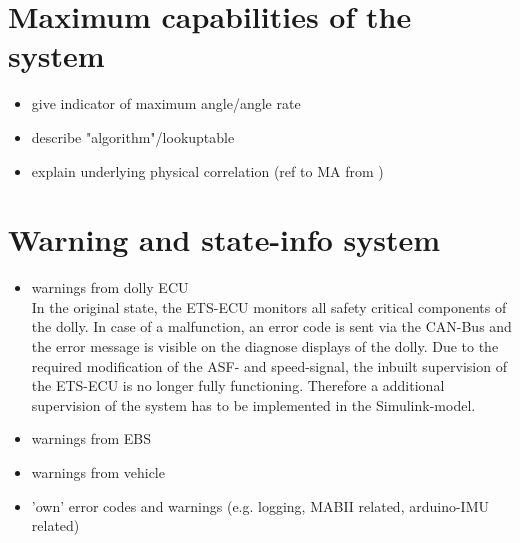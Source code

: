 \documentclass[ExampleMasters.tex]{subfiles}
\begin{document}
\section{Maximum capabilities of the system}
\label{sec:maxi_capabilities}
\begin{itemize}
	\item give indicator of maximum angle/angle rate
	\item describe "algorithm"/lookuptable
	\item explain underlying physical correlation (ref to MA from )
\end{itemize}

\section{Warning and state-info system}
\label{sec:warning_system}
\begin{itemize}
	\item warnings from dolly ECU \\
	In the original state, the ETS-ECU monitors all safety critical components of the dolly. In case of a malfunction, an error code is sent via the CAN-Bus and the error message is visible on the diagnose displays of the dolly.
	Due to the required modification of the ASF- and speed-signal, the inbuilt supervision of the ETS-ECU is no longer fully functioning. Therefore a additional supervision of the system has to be implemented in the Simulink-model.    
	\item warnings from EBS
	\item warnings from vehicle
	\item 'own' error codes and warnings (e.g. logging, MABII related, arduino-IMU related)
\end{itemize}
\end{document}
